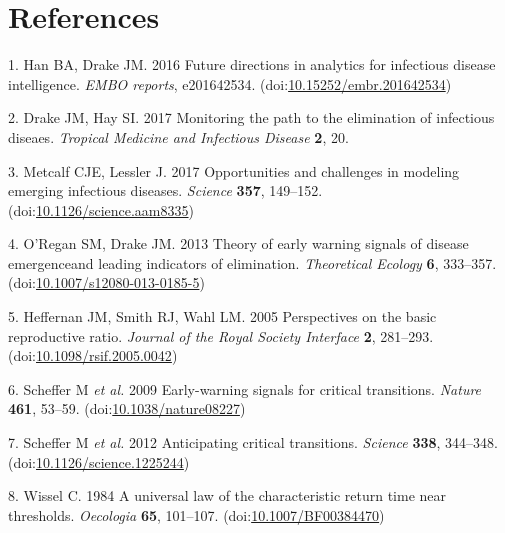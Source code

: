 \documentclass[3p]{elsarticle} %
\begin{document}
\hypertarget{references}{%
\section*{References}\label{references}}

\hypertarget{refs}{}
\leavevmode\hypertarget{ref-Han2016}{}%
1. Han BA, Drake JM. 2016 Future directions in analytics for infectious
disease intelligence. \emph{EMBO reports}, e201642534.
(doi:\href{https://doi.org/10.15252/embr.201642534}{10.15252/embr.201642534})

\leavevmode\hypertarget{ref-Drake2017}{}%
2. Drake JM, Hay SI. 2017 Monitoring the path to the elimination of
infectious diseaes. \emph{Tropical Medicine and Infectious Disease}
\textbf{2}, 20.

\leavevmode\hypertarget{ref-Metcalf2017}{}%
3. Metcalf CJE, Lessler J. 2017 Opportunities and challenges in modeling
emerging infectious diseases. \emph{Science} \textbf{357}, 149--152.
(doi:\href{https://doi.org/10.1126/science.aam8335}{10.1126/science.aam8335})

\leavevmode\hypertarget{ref-ORegan2013}{}%
4. O'Regan SM, Drake JM. 2013 Theory of early warning signals of disease
emergenceand leading indicators of elimination. \emph{Theoretical
Ecology} \textbf{6}, 333--357.
(doi:\href{https://doi.org/10.1007/s12080-013-0185-5}{10.1007/s12080-013-0185-5})

\leavevmode\hypertarget{ref-Heffernan2005}{}%
5. Heffernan JM, Smith RJ, Wahl LM. 2005 Perspectives on the basic
reproductive ratio. \emph{Journal of the Royal Society Interface}
\textbf{2}, 281--293.
(doi:\href{https://doi.org/10.1098/rsif.2005.0042}{10.1098/rsif.2005.0042})

\leavevmode\hypertarget{ref-Scheffer2009}{}%
6. Scheffer M \emph{et al.} 2009 Early-warning signals for critical
transitions. \emph{Nature} \textbf{461}, 53--59.
(doi:\href{https://doi.org/10.1038/nature08227}{10.1038/nature08227})

\leavevmode\hypertarget{ref-Scheffer2012}{}%
7. Scheffer M \emph{et al.} 2012 Anticipating critical transitions.
\emph{Science} \textbf{338}, 344--348.
(doi:\href{https://doi.org/10.1126/science.1225244}{10.1126/science.1225244})

\leavevmode\hypertarget{ref-Wissel1984}{}%
8. Wissel C. 1984 A universal law of the characteristic return time near
thresholds. \emph{Oecologia} \textbf{65}, 101--107.
(doi:\href{https://doi.org/10.1007/BF00384470}{10.1007/BF00384470})
\end{document}
